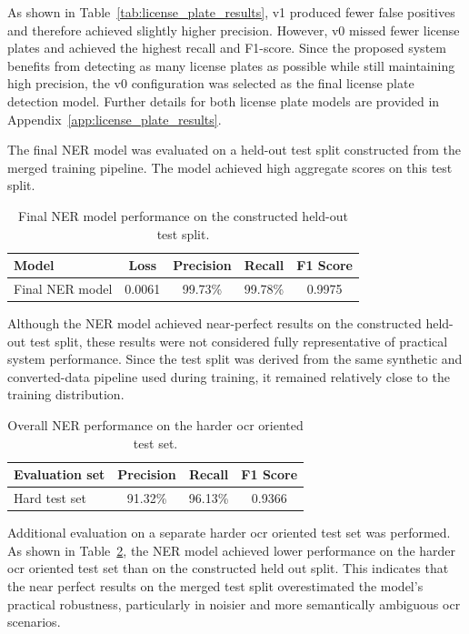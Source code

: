 As shown in Table~\ref{tab:license_plate_results}, v1 produced fewer \gls{false positive}s and therefore achieved slightly higher precision. However, v0 missed fewer license plates and achieved the highest recall and F1-score. Since the proposed system benefits from detecting as many license plates as possible while still maintaining high precision, the v0 configuration was selected as the final license plate detection model. Further details for both license plate models are provided in
Appendix~\ref{app:license_plate_results}.


\label{sec:ner_results}
The final NER model was evaluated on a held-out test split constructed from the merged training pipeline. The model achieved high aggregate scores on this test split.

\begin{table}[H]
\centering
\caption{Final NER model performance on the constructed held-out test split.}
\begin{tabular}{lcccc}
\toprule
Model & Loss & Precision & Recall & F1 Score \\
\midrule
Final NER model & 0.0061 & 99.73\% & 99.78\% & 0.9975 \\
\bottomrule
\end{tabular}
\label{tab:ner_results_main}
\end{table}

Although the NER model achieved near-perfect results on the constructed held-out test split, these results were not considered fully representative of practical system performance. Since the test split was derived from the same synthetic and
converted-data pipeline used during training, it remained relatively close to the training distribution.

\begin{table}[H]
\centering
\caption{Overall NER performance on the harder \acrshort{ocr} oriented test set.}
\begin{tabular}{lccc}
\toprule
Evaluation set & Precision & Recall & F1 Score \\
\midrule
Hard test set & 91.32\% & 96.13\% & 0.9366 \\
\bottomrule
\end{tabular}
\label{tab:ner_results_hard}
\end{table}

Additional evaluation on a separate harder \acrshort{ocr} oriented test set was performed. As shown in Table~\ref{tab:ner_results_hard}, the NER model achieved lower performance on the harder \acrshort{ocr} oriented test set than on the constructed held out split. This indicates that the near perfect results on the merged test split overestimated the model’s practical robustness, particularly in noisier and more semantically ambiguous \acrshort{ocr} scenarios.


